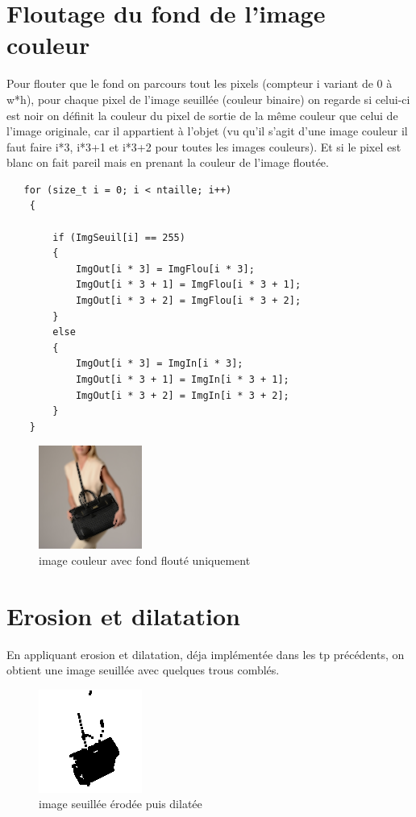 \documentclass{article}
\begin{document}
\newpage
\section{Floutage du fond de l’image couleur}

Pour flouter que le fond on parcours tout les pixels (compteur i variant de 0 à w*h), pour chaque pixel de l'image seuillée (couleur binaire) on regarde si celui-ci est noir on définit la couleur du pixel de sortie de la même couleur que celui de l'image originale, car il appartient à l'objet (vu qu'il s'agit d'une image couleur il faut faire i*3, i*3+1 et i*3+2 pour toutes les images couleurs).
Et si le pixel est blanc on fait pareil mais en prenant la couleur de l'image floutée. 
\begin{lstlisting}
   for (size_t i = 0; i < ntaille; i++)
    {

        if (ImgSeuil[i] == 255)
        {
            ImgOut[i * 3] = ImgFlou[i * 3];
            ImgOut[i * 3 + 1] = ImgFlou[i * 3 + 1];
            ImgOut[i * 3 + 2] = ImgFlou[i * 3 + 2];
        }
        else
        {
            ImgOut[i * 3] = ImgIn[i * 3];
            ImgOut[i * 3 + 1] = ImgIn[i * 3 + 1];
            ImgOut[i * 3 + 2] = ImgIn[i * 3 + 2];
        }
    }

\end{lstlisting}

\begin{figure}[h!]
\centerline{\includegraphics[scale=1.2]{./rendus/couleurFondFlou.png}}
\caption{image couleur avec fond flouté uniquement }
\end{figure}

\newpage
\section{Erosion et dilatation}

En appliquant erosion et dilatation, déja implémentée dans les tp précédents, on obtient une image seuillée avec quelques trous comblés.

\begin{figure}[h!]
\centerline{\includegraphics[scale=1.2]{./rendus/seuilEroDila.png}}
\caption{image seuillée érodée puis dilatée }
\end{figure}
\end{document}
